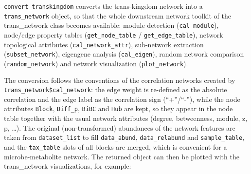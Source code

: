 \documentclass[
]{book}
\newenvironment{Shaded}{\begin{snugshade}}{\end{snugshade}}
\newcommand{\AttributeTok}[1]{\textcolor[rgb]{0.13,0.29,0.53}{#1}}
\newcommand{\ConstantTok}[1]{\textcolor[rgb]{0.56,0.35,0.01}{#1}}
\newcommand{\FunctionTok}[1]{\textcolor[rgb]{0.13,0.29,0.53}{\textbf{#1}}}
\newcommand{\NormalTok}[1]{#1}
\newcommand{\OtherTok}[1]{\textcolor[rgb]{0.56,0.35,0.01}{#1}}
\newcommand{\SpecialCharTok}[1]{\textcolor[rgb]{0.81,0.36,0.00}{\textbf{#1}}}
\newcommand{\StringTok}[1]{\textcolor[rgb]{0.31,0.60,0.02}{#1}}
\begin{document}
\texttt{convert\_transkingdom} converts the trans-kingdom network into a \texttt{trans\_network} object, so that the whole downstream network toolkit of the trans\_network class becomes available: module detection (\texttt{cal\_module}), node/edge property tables (\texttt{get\_node\_table} / \texttt{get\_edge\_table}), network topological attributes (\texttt{cal\_network\_attr}), sub-network extraction (\texttt{subset\_network}), eigengene analysis (\texttt{cal\_eigen}), random network comparison (\texttt{random\_network}) and network visualization (\texttt{plot\_network}).

\begin{Shaded}
\end{Shaded}

The conversion follows the conventions of the correlation networks created by \texttt{trans\_network\$cal\_network}: the edge weight is re-defined as the absolute correlation and the edge label as the correlation sign (``+''/``-''), while the node attributes \texttt{Block}, \texttt{Diff\_p}, \texttt{BiBC} and \texttt{Hub} are kept, so they appear in the node table together with the usual network attributes (degree, betweenness, module, z, p, \ldots).
The original (non-transformed) abundances of the network features are taken from \texttt{dataset\_list} to fill \texttt{data\_abund}, \texttt{data\_relabund} and \texttt{sample\_table}, and the \texttt{tax\_table} slots of all blocks are merged, which is convenient for a microbe-metabolite network.
The returned object can then be plotted with the trans\_network visualizations, for example:

\begin{Shaded}
\end{Shaded}
\end{document}
